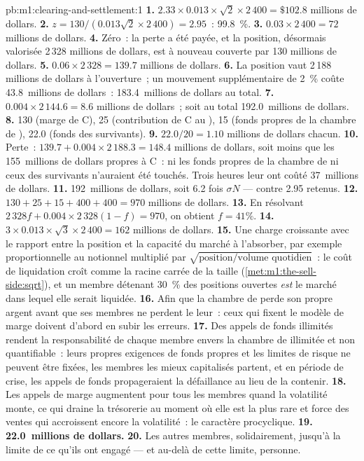 \begin{solution}{pb:m1:clearing-and-settlement:1}
\textbf{1.} $2.33 \times 0.013 \times \sqrt2 \times 2\,400 = \$102.8$
millions de dollars.
\textbf{2.} $z = 130/(0.013\sqrt2 \times 2\,400) = 2.95$~: 99.8~\%.
\textbf{3.} $0.03 \times 2\,400 = 72$ millions de dollars.
\textbf{4.} Zéro~: la perte a été payée, et la position, désormais valorisée
2\,328 millions de dollars, est à nouveau couverte par 130 millions de dollars.
\textbf{5.} $0.06 \times 2\,328 = 139.7$ millions de dollars.
\textbf{6.} La position vaut 2\,188 millions de dollars à l'ouverture~; un mouvement supplémentaire de 2~\%
coûte 43.8~millions de dollars~: 183.4~millions de dollars au total.
\textbf{7.} $0.004 \times 2\,144.6 = 8.6$ millions de dollars~; soit au total 192.0~millions de dollars.
\textbf{8.} 130 (marge de C), 25 (contribution de C au ), 15 (fonds propres
de la chambre de ), 22.0 (fonds des survivants).
\textbf{9.} $22.0/20 = 1.10$ millions de dollars chacun.
\textbf{10.} Perte~: $139.7 + 0.004 \times 2\,188.3 = 148.4$ millions de dollars, soit moins
que les 155~millions de dollars propres à C~: ni les fonds propres de la chambre de  ni
ceux des survivants n'auraient été touchés. Trois heures leur ont coûté 37~millions de dollars.
\textbf{11.} 192~millions de dollars, soit 6.2 fois $\sigma N$ --- contre 2.95
retenus.
\textbf{12.} $130+25+15+400+400 = 970$ millions de dollars.
\textbf{13.} En résolvant $2\,328 f + 0.004 \times 2\,328(1-f) = 970$, on obtient $f =
41\%$.
\textbf{14.} $3 \times 0.013 \times \sqrt3 \times 2\,400 = 162$ millions de dollars.
\textbf{15.} Une charge croissante avec le rapport entre la position et la capacité du marché
à l'absorber, par exemple proportionnelle au notionnel multiplié par
$\sqrt{\text{position}/\text{volume quotidien}}$~: le coût de liquidation croît
comme la racine carrée de la taille (\cref{met:m1:the-sell-side:sqrt}), et un membre
détenant 30~\% des positions ouvertes \emph{est} le marché dans lequel elle serait
liquidée.
\textbf{16.} Afin que la chambre de  perde son propre argent avant que ses
membres ne perdent le leur~: ceux qui fixent le modèle de marge doivent d'abord
en subir les erreurs.
\textbf{17.} Des appels de fonds illimités rendent la responsabilité de chaque membre envers la
chambre de  illimitée et non quantifiable~: leurs propres exigences de fonds propres
et les limites de risque ne peuvent être fixées, les membres les mieux capitalisés partent, et en
période de crise, les appels de fonds propageraient la défaillance au lieu de la
contenir.
\textbf{18.} Les appels de marge augmentent pour tous les membres quand la volatilité monte, ce qui draine
la trésorerie au moment où elle est la plus rare et force des ventes qui accroissent
encore la volatilité~: le caractère procyclique.
\textbf{19.} \textbf{22.0~millions de dollars.}
\textbf{20.} Les autres membres, solidairement, jusqu'à la limite de ce qu'ils ont
engagé --- et au-delà de cette limite, personne.
\end{solution}

